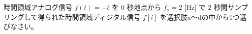 時間領域アナログ信号 $f(t) = -t$ を $0$ 秒地点から $f_s = 2$ [Hz] で $2$ 秒間サンプリングして得られた時間領域ディジタル信号 $f[i]$ を選択肢a〜dの中から1つ選びなさい。
